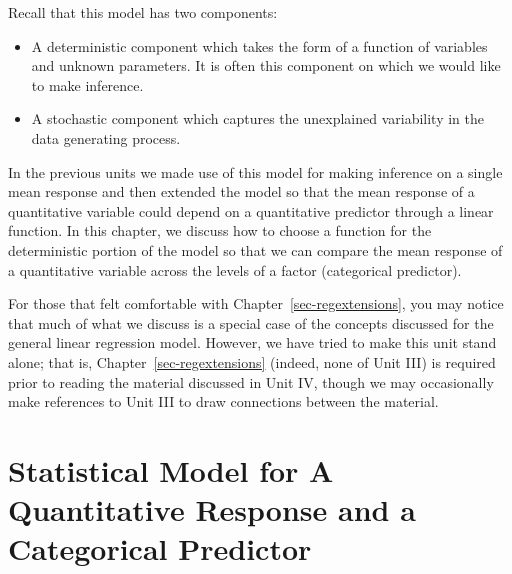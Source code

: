 \documentclass[
  letterpaper,
  DIV=11,
  numbers=noendperiod]{scrreprt}
\providecommand{\tightlist}{%
  \setlength{\itemsep}{0pt}\setlength{\parskip}{0pt}}\usepackage{longtable,booktabs,array}
\theoremstyle{plain}
\theoremstyle{definition}
\theoremstyle{definition}
\theoremstyle{remark}
\begin{document}
Recall that this model has two components:

\begin{itemize}
\tightlist
\item
  A deterministic component which takes the form of a function of
  variables and unknown parameters. It is often this component on which
  we would like to make inference.
\item
  A stochastic component which captures the unexplained variability in
  the data generating process.
\end{itemize}

In the previous units we made use of this model for making inference on
a single mean response and then extended the model so that the mean
response of a quantitative variable could depend on a quantitative
predictor through a linear function. In this chapter, we discuss how to
choose a function for the deterministic portion of the model so that we
can compare the mean response of a quantitative variable across the
levels of a factor (categorical predictor).

\begin{tcolorbox}[enhanced jigsaw, breakable, titlerule=0mm, colframe=quarto-callout-note-color-frame, bottomtitle=1mm, opacityback=0, rightrule=.15mm, toptitle=1mm, arc=.35mm, bottomrule=.15mm, left=2mm, title=\textcolor{quarto-callout-note-color}{\faInfo}\hspace{0.5em}{Note}, leftrule=.75mm, coltitle=black, toprule=.15mm, colbacktitle=quarto-callout-note-color!10!white, colback=white, opacitybacktitle=0.6]

For those that felt comfortable with Chapter~\ref{sec-regextensions},
you may notice that much of what we discuss is a special case of the
concepts discussed for the general linear regression model. However, we
have tried to make this unit stand alone; that is,
Chapter~\ref{sec-regextensions} (indeed, none of Unit III) is required
prior to reading the material discussed in Unit IV, though we may
occasionally make references to Unit III to draw connections between the
material.

\end{tcolorbox}

\section{Statistical Model for A Quantitative Response and a Categorical
Predictor}\label{statistical-model-for-a-quantitative-response-and-a-categorical-predictor}
\end{document}
